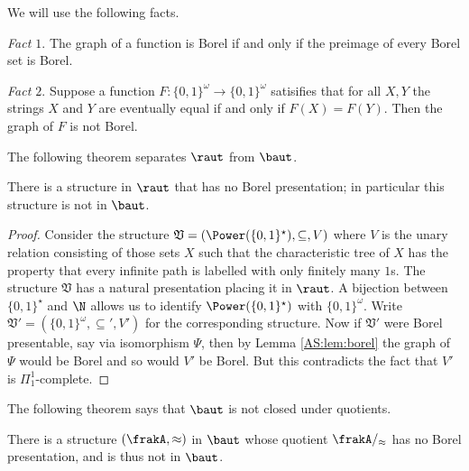 We will use the following facts. %

{\em Fact $1.$} The graph of a function is Borel if and only if the preimage of every Borel set is Borel.

{\em Fact $2.$}  Suppose a function $F:\{0,1\}^\omega \to \{0,1\}^\omega$ satisifies that for all $X,Y$ 
the strings $X$ and $Y$ are eventually equal if and only if $F(X) = F(Y)$. Then the graph of $F$ is not Borel.

The following theorem separates $\raut$ from $\baut$.

\begin{theorem} \label{AS:thm:sep}
There is a structure in $\raut$ that has no Borel presentation; in particular this structure is not in $\baut$.
\end{theorem}

\begin{proof}
Consider the structure $\mathfrak{V} = (\Power(\{0,1\}^\star),\subseteq,V)$ where $V$ is the unary relation consisting of those sets $X$ such that
the characteristic tree of $X$ has the property that every infinite path is labelled with only finitely many $1$s. The structure $\mathfrak{V}$ has a natural presentation placing it in $\raut$. A bijection between $\{0,1\}^\star$ and $\N$ allows us to identify $\Power(\{0,1\}^\star)$ with $\{0,1\}^\omega$.
Write $\mathfrak{V'} = (\{0,1\}^\omega,\subseteq',V')$ for the corresponding structure. 
Now if $\mathfrak{V'}$ were Borel presentable, say via isomorphism $\Psi$, then by Lemma \ref{AS:lem:borel} the graph of $\Psi$ would be Borel and so would $V'$ be Borel. But this contradicts the fact that $V'$ is $\Pi_1^1$-complete. %
\end{proof}

The following theorem says that $\baut$ is not closed under quotients.

\begin{theorem} \label{AS:thm:borel}
There is a structure $(\frakA,\approx)$ in $\baut$ whose quotient $\frakA/_{\approx}$ has no Borel presentation, and is thus not in $\baut$.
\end{theorem}

